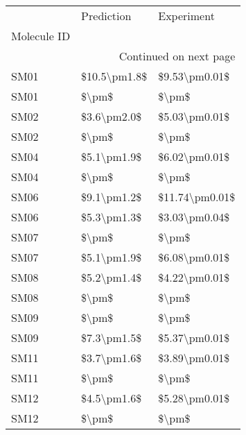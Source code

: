 \begin{longtable}{lll}
\toprule
{} &    Prediction &      Experiment \\
Molecule ID &               &                 \\
\midrule
\endhead
\midrule
\multicolumn{3}{r}{{Continued on next page}} \\
\midrule
\endfoot

\bottomrule
\endlastfoot
SM01        &  \$10.5\textbackslash pm1.8\$ &   \$9.53\textbackslash pm0.01\$ \\
SM01        &         \$\textbackslash pm\$ &           \$\textbackslash pm\$ \\
SM02        &   \$3.6\textbackslash pm2.0\$ &   \$5.03\textbackslash pm0.01\$ \\
SM02        &         \$\textbackslash pm\$ &           \$\textbackslash pm\$ \\
SM04        &   \$5.1\textbackslash pm1.9\$ &   \$6.02\textbackslash pm0.01\$ \\
SM04        &         \$\textbackslash pm\$ &           \$\textbackslash pm\$ \\
SM06        &   \$9.1\textbackslash pm1.2\$ &  \$11.74\textbackslash pm0.01\$ \\
SM06        &   \$5.3\textbackslash pm1.3\$ &   \$3.03\textbackslash pm0.04\$ \\
SM07        &         \$\textbackslash pm\$ &           \$\textbackslash pm\$ \\
SM07        &   \$5.1\textbackslash pm1.9\$ &   \$6.08\textbackslash pm0.01\$ \\
SM08        &   \$5.2\textbackslash pm1.4\$ &   \$4.22\textbackslash pm0.01\$ \\
SM08        &         \$\textbackslash pm\$ &           \$\textbackslash pm\$ \\
SM09        &         \$\textbackslash pm\$ &           \$\textbackslash pm\$ \\
SM09        &   \$7.3\textbackslash pm1.5\$ &   \$5.37\textbackslash pm0.01\$ \\
SM11        &   \$3.7\textbackslash pm1.6\$ &   \$3.89\textbackslash pm0.01\$ \\
SM11        &         \$\textbackslash pm\$ &           \$\textbackslash pm\$ \\
SM12        &   \$4.5\textbackslash pm1.6\$ &   \$5.28\textbackslash pm0.01\$ \\
SM12        &         \$\textbackslash pm\$ &           \$\textbackslash pm\$ \\

\end{longtable}
